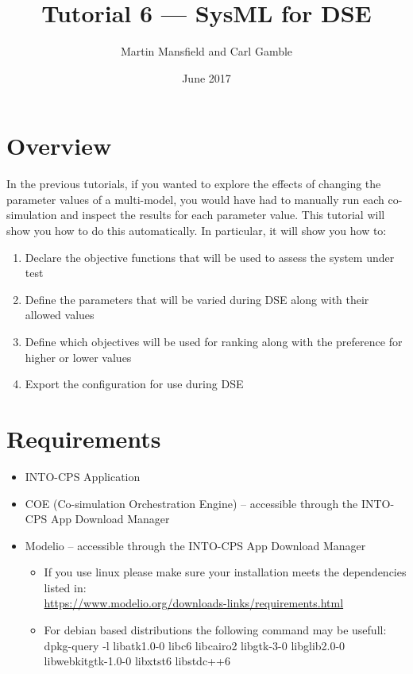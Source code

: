 \documentclass[11pt,a4paper]{../tutorial}
\title{Tutorial 6 --- SysML for DSE}
\date{June 2017}
\author{Martin Mansfield and Carl Gamble}
\begin{document}
\section*{Overview}

In the previous tutorials, if you wanted to explore the effects of changing the parameter values of a multi-model, you would have had to manually run each co-simulation and inspect the results for each parameter value.
This tutorial will show you how to do this automatically.
In particular, it will show you how to:

\begin{enumerate}[noitemsep]
\item Declare the objective functions that will be used to assess the system under test
\item Define the parameters that will be varied during DSE along with their allowed values
\item Define which objectives will be used for ranking along with the preference for higher or lower values
\item Export the configuration for use during DSE
\end{enumerate}

\section*{Requirements}

\begin{itemize}[noitemsep]
	\item INTO-CPS Application
	\item COE (Co-simulation Orchestration Engine) -- accessible through the INTO-CPS App Download Manager
	\item Modelio -- accessible through the INTO-CPS App Download Manager
	\begin{small}
		\begin{itemize}
			\item If you use linux please make sure your installation meets the dependencies listed in:\\ \url{https://www.modelio.org/downloads-links/requirements.html}
			\item For debian based distributions the following command may be usefull:\\
			dpkg-query -l  libatk1.0-0 libc6 libcairo2 libgtk-3-0 libglib2.0-0 libwebkitgtk-1.0-0 libxtst6 libstdc++6
		\end{itemize}
	\end{small}
\end{itemize}
\end{document}
